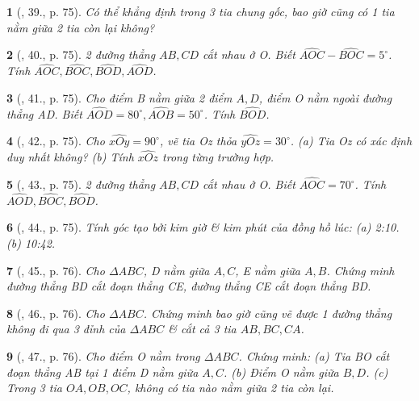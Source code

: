 \documentclass{article}
\newtheorem{baitoan}{}
\begin{document}
\begin{baitoan}[\cite{Binh_Toan_6_tap_2}, 39., p. 75]
	Có thể khẳng định trong 3 tia chung gốc, bao giờ cũng có 1 tia nằm giữa 2 tia còn lại không?
\end{baitoan}

\begin{baitoan}[\cite{Binh_Toan_6_tap_2}, 40., p. 75]
	2 đường thẳng $AB,CD$ cắt nhau ở O. Biết $ \widehat{AOC} - \widehat{BOC} = 5^\circ$. Tính $\widehat{AOC},\widehat{BOC},\widehat{BOD},\widehat{AOD}$.
\end{baitoan}

\begin{baitoan}[\cite{Binh_Toan_6_tap_2}, 41., p. 75]
	Cho điểm B nằm giữa 2 điểm $A,D$, điểm O nằm ngoài đường thẳng AD. Biết $\widehat{AOD} = 80^\circ,\widehat{AOB} = 50^\circ$. Tính $\widehat{BOD}$.
\end{baitoan}

\begin{baitoan}[\cite{Binh_Toan_6_tap_2}, 42., p. 75]
	Cho $\widehat{xOy} = 90^\circ$, vẽ tia Oz thỏa $\widehat{yOz} = 30^\circ$. (a) Tia Oz có xác định duy nhất không? (b) Tính $\widehat{xOz}$ trong từng trường hợp.
\end{baitoan}

\begin{baitoan}[\cite{Binh_Toan_6_tap_2}, 43., p. 75]
	2 đường thẳng $AB,CD$ cắt nhau ở O. Biết $\widehat{AOC} = 70^\circ$. Tính $\widehat{AOD},\widehat{BOC},\widehat{BOD}$.
\end{baitoan}

\begin{baitoan}[\cite{Binh_Toan_6_tap_2}, 44., p. 75]
	Tính góc tạo bởi kim giờ \& kim phút của đồng hồ lúc: (a) {\rm2:10}. (b) {\rm10:42}.
\end{baitoan}

\begin{baitoan}[\cite{Binh_Toan_6_tap_2}, 45., p. 76]
	Cho $\Delta ABC$, D nằm giữa $A,C$, E nằm giữa $A,B$. Chứng minh đường thẳng BD cắt đoạn thẳng CE, đường thẳng CE cắt đoạn thẳng BD.
\end{baitoan}

\begin{baitoan}[\cite{Binh_Toan_6_tap_2}, 46., p. 76]
	Cho $\Delta ABC$. Chứng minh bao giờ cũng vẽ được 1 đường thẳng không đi qua 3 đỉnh của $\Delta ABC$ \& cắt cả 3 tia $AB,BC,CA$.
\end{baitoan}

\begin{baitoan}[\cite{Binh_Toan_6_tap_2}, 47., p. 76]
	Cho điểm O nằm trong $\Delta ABC$. Chứng minh: (a) Tia BO cắt đoạn thẳng AB tại 1 điểm D nằm giữa $A,C$. (b) Điểm O nằm giữa $B,D$. (c) Trong 3 tia $OA,OB,OC$, không có tia nào nằm giữa 2 tia còn lại.
\end{baitoan}
\end{document}

